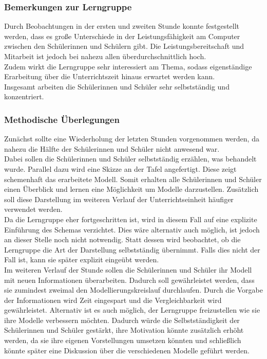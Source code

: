 \subsubsection*{Bemerkungen zur Lerngruppe}
Durch Beobachtungen in der ersten und zweiten Stunde konnte festgestellt werden, dass es große Unterschiede in der Leistungsfähigkeit am Computer zwischen den Schülerinnen und Schülern gibt. Die Leistungsbereitschaft und Mitarbeit ist jedoch bei nahezu allen überdurchschnittlich hoch.\\ Zudem wirkt die Lerngruppe sehr interessiert am Thema, sodass eigenständige Erarbeitung über die Unterrichtszeit hinaus erwartet werden kann.\\
  Insgesamt arbeiten die Schülerinnen und Schüler sehr selbstständig und konzentriert. 
\subsubsection*{Methodische Überlegungen}
Zunächst sollte eine Wiederholung der letzten Stunden vorgenommen werden, da nahezu die Hälfte der Schülerinnen und Schüler nicht anwesend war.\\
Dabei sollen die Schülerinnen und Schüler selbstständig erzählen, was behandelt wurde. Parallel dazu wird eine Skizze an der Tafel angefertigt. Diese zeigt schemenhaft das erarbeitete Modell. Somit erhalten alle Schülerinnen und Schüler einen Überblick und lernen eine Möglichkeit um Modelle darzustellen. Zusätzlich soll diese Darstellung im weiteren Verlauf der Unterrichtseinheit häufiger verwendet werden.\\
Da die Lerngruppe eher fortgeschritten ist, wird in diesem Fall auf eine explizite Einführung des Schemas verzichtet. Dies wäre alternativ auch möglich, ist jedoch an dieser Stelle noch nicht notwendig. Statt dessen wird beobachtet, ob die Lerngruppe die Art der Darstellung selbstständig übernimmt. Falls dies nicht der Fall ist, kann sie später explizit eingeübt werden.\\
Im weiteren Verlauf der Stunde sollen die Schülerinnen und Schüler ihr Modell mit neuen Informationen überarbeiten. Dadurch soll gewährleistet werden, dass sie zumindest zweimal den Modellierungskreislauf durchlaufen. Durch die Vorgabe der Informationen wird Zeit eingespart und die Vergleichbarkeit wird gewährleistet. Alternativ ist es auch möglich, der Lerngruppe freizustellen wie sie ihre Modelle verbessern möchten. Dadurch würde die Selbstständigkeit der Schülerinnen und Schüler gestärkt, ihre Motivation könnte zusätzlich erhöht werden, da sie ihre eigenen Vorstellungen umsetzen könnten und schließlich könnte später eine Diskussion über die verschiedenen Modelle geführt werden.\\
